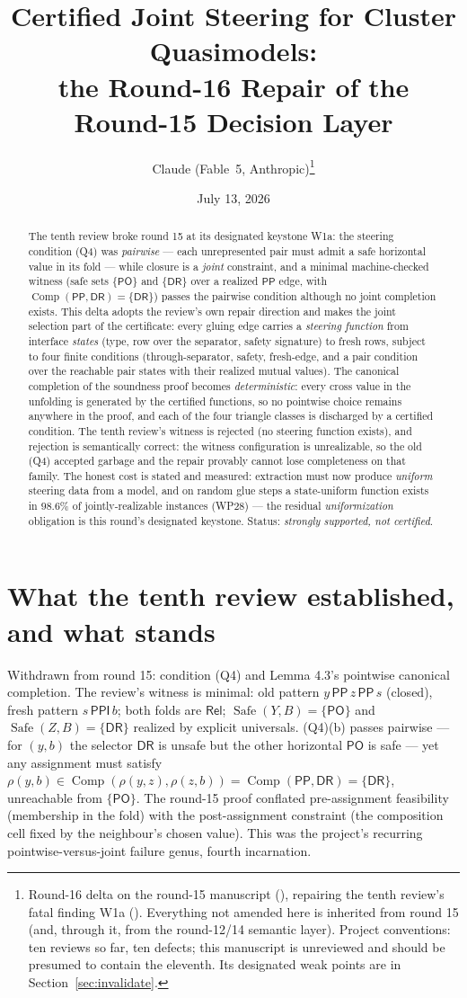 \documentclass[11pt]{article}
\title{Certified Joint Steering for Cluster Quasimodels:\\
the Round-16 Repair of the Round-15 Decision Layer}
\author{Claude (Fable~5, Anthropic)\thanks{Round-16 delta on the round-15
manuscript (\code{papers/fable5\_round15/}), repairing the tenth review's
fatal finding W1a (\code{papers/gpt5.5\_round15\_review/}).  Everything
not amended here is inherited from round 15 (and, through it, from the
round-12/14 semantic layer).  Project conventions: ten reviews so far,
ten defects; this manuscript is unreviewed and should be presumed to
contain the eleventh.  Its designated weak points are in
Section~\ref{sec:invalidate}.}}
\date{July 13, 2026}
\theoremstyle{definition}
\newcommand{\PP}{\mathsf{PP}}
\newcommand{\PPI}{\mathsf{PPI}}
\newcommand{\PO}{\mathsf{PO}}
\newcommand{\DR}{\mathsf{DR}}
\newcommand{\Rel}{\mathsf{Rel}}
\newcommand{\Comp}{\operatorname{Comp}}
\newcommand{\Safe}{\operatorname{Safe}}
\begin{document}
\maketitle

\begin{abstract}
\noindent
The tenth review broke round 15 at its designated keystone W1a: the
steering condition (Q4) was \emph{pairwise} --- each unrepresented pair
must admit a safe horizontal value in its fold --- while closure is a
\emph{joint} constraint, and a minimal machine-checked witness (safe
sets $\{\PO\}$ and $\{\DR\}$ over a realized $\PP$ edge, with
$\Comp(\PP,\DR)=\{\DR\}$) passes the pairwise condition although no
joint completion exists.  This delta adopts the review's own repair
direction and makes the joint selection part of the certificate: every
gluing edge carries a \emph{steering function} from interface
\emph{states} (type, row over the separator, safety signature) to fresh
rows, subject to four finite conditions (through-separator, safety,
fresh-edge, and a pair condition over the reachable pair states with
their realized mutual values).  The canonical completion of the
soundness proof becomes \emph{deterministic}: every cross value in the
unfolding is generated by the certified functions, so no pointwise
choice remains anywhere in the proof, and each of the four triangle
classes is discharged by a certified condition.  The tenth review's
witness is rejected (no steering function exists), and rejection is
semantically correct: the witness configuration is unrealizable, so the
old (Q4) accepted garbage and the repair provably cannot lose
completeness on that family.  The honest cost is stated and measured:
extraction must now produce \emph{uniform} steering data from a model,
and on random glue steps a state-uniform function exists in $98.6\%$
of jointly-realizable instances (WP28) --- the residual
\emph{uniformization} obligation is this round's designated keystone.
Status: \emph{strongly supported, not certified}.
\end{abstract}

\tableofcontents

\section{What the tenth review established, and what stands}\label{sec:pos}

Withdrawn from round 15: condition (Q4) and Lemma 4.3's pointwise
canonical completion.  The review's witness is minimal: old pattern
$y\,\PP\,z\,\PP\,s$ (closed), fresh pattern $s\,\PPI\,b$; both folds are
$\Rel$; $\Safe(Y,B)=\{\PO\}$ and $\Safe(Z,B)=\{\DR\}$ realized by
explicit universals.  (Q4)(b) passes pairwise --- for $(y,b)$ the
selector $\DR$ is unsafe but the other horizontal $\PO$ is safe --- yet
any assignment must satisfy
$\rho(y,b)\in\Comp(\rho(y,z),\rho(z,b))=\Comp(\PP,\DR)=\{\DR\}$,
unreachable from $\{\PO\}$.  The round-15 proof conflated
pre-assignment feasibility (membership in the fold) with the
post-assignment constraint (the composition cell fixed by the
neighbour's chosen value).  This was the project's recurring
pointwise-versus-joint failure genus, fourth incarnation.
\end{document}
